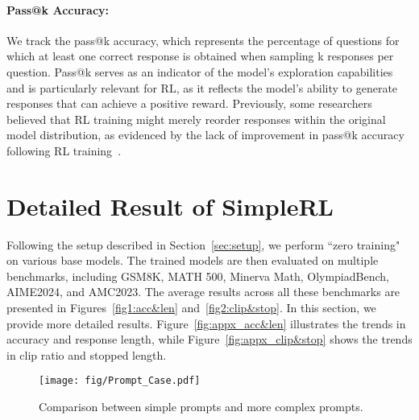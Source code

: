 \paragraph{Pass@k Accuracy:}
We track the pass@k accuracy, which represents the percentage of questions for which at least one correct response is obtained when sampling k responses per question. Pass@k serves as an indicator of the model's exploration capabilities and is particularly relevant for RL, as it reflects the model's ability to generate responses that can achieve a positive reward. Previously, some researchers believed that RL training might merely reorder responses within the original model distribution, as evidenced by the lack of improvement in pass@k accuracy following RL training~\citep{shao2024deepseekmath}.



\section{Detailed Result of SimpleRL}
\label{appx:DetailedResult}
Following the setup described in Section~\ref{sec:setup}, we perform ``zero training" on various base models. The trained models are then evaluated on multiple benchmarks, including GSM8K, MATH 500, Minerva Math, OlympiadBench, AIME2024, and AMC2023. The average results across all these benchmarks are presented in Figures~\ref{fig1:acc&len} and~\ref{fig2:clip&stop}. In this section, we provide more detailed results. Figure~\ref{fig:appx_acc&len} illustrates the trends in accuracy and response length, while Figure~\ref{fig:appx_clip&stop} shows the trends in clip ratio and stopped length.





\begin{figure}[!t]
        \centering
\texttt{[image: fig/Prompt\_Case.pdf]}
\caption{Comparison between simple prompts and more complex prompts.}
        \label{fig:prompt_case}
\end{figure}


